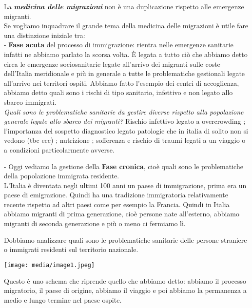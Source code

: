 \documentclass[]{article}
\begin{document}
La \textbf{\emph{medicina delle migrazioni}} non è una duplicazione
rispetto alle emergenze migranti.\\
Se vogliamo inquadrare il grande tema della medicina delle migrazioni è
utile fare una distinzione iniziale tra:\\
- \textbf{Fase acuta} del processo di immigrazione: rientra nelle
emergenze sanitarie infatti ne abbiamo parlato la scorsa volta. È legata
a tutto ciò che abbiamo detto circa le emergenze sociosanitarie legate
all'arrivo dei migranti sulle coste dell'Italia meridionale e più in
generale a tutte le problematiche gestionali legate all'arrivo nei
territori ospiti. Abbiamo fatto l'esempio dei centri di accoglienza,
abbiamo detto quali sono i rischi di tipo sanitario, infettivo e non
legato allo sbarco immigrati.\\
\emph{Quali sono le problematiche sanitarie da gestire diverse rispetto
alla popolazione generale legate allo sbarco dei migranti?} Rischio
infettivo legato a overcrowding ; l'importanza del sospetto diagnostico
legato patologie che in italia di solito non si vedono (tbc ecc) ;
nutrizione ; sofferenza e rischio di traumi legati a un viaggio o a
condizioni particolarmente avverse.

- Oggi vediamo la gestione della \textbf{Fase cronica}, cioè quali sono
le problematiche della popolazione immigrata residente.\\
L'Italia è diventata negli ultimi 100 anni un paese di immigrazione,
prima era un paese di emigrazione. Quindi ha una tradizione immigratoria
relativamente recente rispetto ad altri paesi come per esempio la
Francia. Quindi in Italia abbiamo migranti di prima generazione, cioè
persone nate all'esterno, abbiamo migranti di seconda generazione e più
o meno ci fermiamo lì.

Dobbiamo analizzare quali sono le problematiche sanitarie delle persone
straniere o immigrati residenti sul territorio nazionale.

\texttt{[image: media/image1.jpeg]}

Questo è uno schema che riprende quello che abbiamo detto: abbiamo il
processo migratorio, il paese di origine, abbiamo il viaggio e poi
abbiamo la permanenza a medio e lungo termine nel paese ospite.
\end{document}
